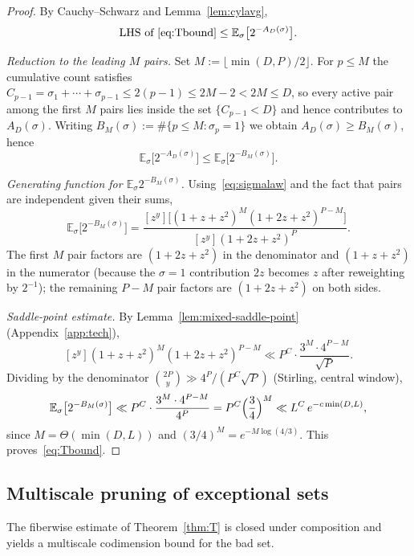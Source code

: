 \documentclass[11pt,a4paper]{amsart}
\theoremstyle{plain}
\theoremstyle{definition}
\newcommand{\E}{\mathbb{E}}
\begin{document}
\begin{proof}
By Cauchy--Schwarz and Lemma~\ref{lem:cylavg},
$$
\text{LHS of \eqref{eq:Tbound}}\le\E_\sigma\bigl[2^{-A_D(\sigma)}\bigr].
$$

\emph{Reduction to the leading $M$ pairs.}
Set $M:=\lfloor\min(D,P)/2\rfloor$.
For $p\le M$ the cumulative count satisfies
$C_{p-1}=\sigma_1+\cdots+\sigma_{p-1}\le 2(p-1)\le 2M-2<2M\le D$,
so every active pair among the first $M$ pairs lies inside the set
$\{C_{p-1}<D\}$ and hence contributes to $A_D(\sigma)$.
Writing $B_M(\sigma):=\#\{p\le M:\sigma_p=1\}$ we obtain
$A_D(\sigma)\ge B_M(\sigma)$, hence
\begin{equation}\label{eq:reduceMB}
\E_\sigma\bigl[2^{-A_D(\sigma)}\bigr]\le\E_\sigma\bigl[2^{-B_M(\sigma)}\bigr].
\end{equation}

\emph{Generating function for $\E_\sigma 2^{-B_M(\sigma)}$.}
Using~\eqref{eq:sigmalaw} and the fact that pairs are independent given
their sums,
\begin{equation}\label{eq:GFM}
\E_\sigma\bigl[2^{-B_M(\sigma)}\bigr]
=\frac{[z^y]\bigl[(1+z+z^2)^M(1+2z+z^2)^{P-M}\bigr]}
{[z^y](1+2z+z^2)^P}.
\end{equation}
The first $M$ pair factors are $(1+2z+z^2)$ in the denominator and
$(1+z+z^2)$ in the numerator (because the $\sigma=1$ contribution
$2z$ becomes $z$ after reweighting by $2^{-1}$); the remaining $P-M$
pair factors are $(1+2z+z^2)$ on both sides.

\emph{Saddle-point estimate.}
By Lemma~\ref{lem:mixed-saddle-point} (Appendix~\ref{app:tech}),
$$
[z^y](1+z+z^2)^M(1+2z+z^2)^{P-M}\ll P^C\cdot\frac{3^M\cdot 4^{P-M}}{\sqrt P}.
$$
Dividing by the denominator $\binom{2P}{y}\gg 4^P/(P^{C}\sqrt P)$
(Stirling, central window),
\begin{equation}\label{eq:Tboundproof}
\E_\sigma\bigl[2^{-B_M(\sigma)}\bigr]
\ll P^{C}\cdot\frac{3^M\cdot 4^{P-M}}{4^P}
=P^{C}\Bigl(\frac{3}{4}\Bigr)^M
\ll L^C\,e^{-c\min(D,L)},
\end{equation}
since $M=\Theta(\min(D,L))$ and $(3/4)^M=e^{-M\log(4/3)}$.
This proves~\eqref{eq:Tbound}.
\end{proof}

\subsection{Multiscale pruning of exceptional sets}
The fiberwise estimate of Theorem~\ref{thm:T} is closed under composition
and yields a multiscale codimension bound for the bad set.
\end{document}
